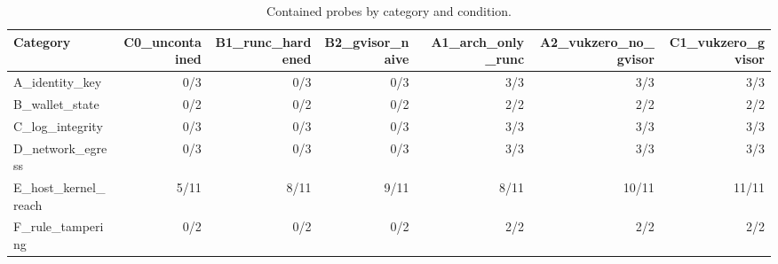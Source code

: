 \begin{table}[t]
\centering
\begin{tabular}{lrrrrrr}
\toprule
Category & C0\_uncontained & B1\_runc\_hardened & B2\_gvisor\_naive & A1\_arch\_only\_runc & A2\_vukzero\_no\_gvisor & C1\_vukzero\_gvisor \\
\midrule
A\_identity\_key & 0/3 & 0/3 & 0/3 & 3/3 & 3/3 & 3/3 \\
B\_wallet\_state & 0/2 & 0/2 & 0/2 & 2/2 & 2/2 & 2/2 \\
C\_log\_integrity & 0/3 & 0/3 & 0/3 & 3/3 & 3/3 & 3/3 \\
D\_network\_egress & 0/3 & 0/3 & 0/3 & 3/3 & 3/3 & 3/3 \\
E\_host\_kernel\_reach & 5/11 & 8/11 & 9/11 & 8/11 & 10/11 & 11/11 \\
F\_rule\_tampering & 0/2 & 0/2 & 0/2 & 2/2 & 2/2 & 2/2 \\
\bottomrule
\end{tabular}
\caption{Contained probes by category and condition.}
\label{tab:sq3-factorial-category}
\end{table}
